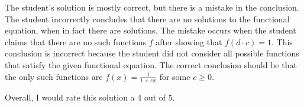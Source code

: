 The student's solution is mostly correct, but there is a mistake in the conclusion. The student incorrectly concludes that there are no solutions to the functional equation, when in fact there are solutions. The mistake occurs when the student claims that there are no such functions $f$ after showing that $f(d\cdot c) = 1$. This conclusion is incorrect because the student did not consider all possible functions that satisfy the given functional equation. The correct conclusion should be that the only such functions are $f(x) = \frac{1}{1+cx}$ for some $c \geq 0$. 

Overall, I would rate this solution a 4 out of 5.
